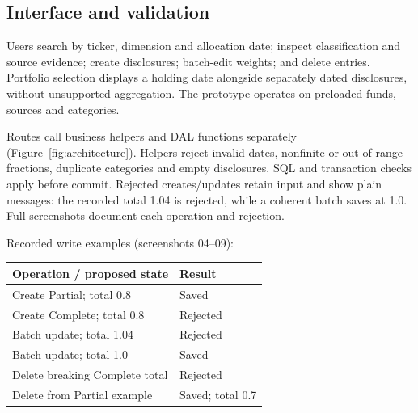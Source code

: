 \subsection{Interface and validation}
Users search by ticker, dimension and allocation date; inspect classification
and source evidence; create disclosures; batch-edit weights; and delete entries.
Portfolio selection displays a holding date alongside separately dated
disclosures, without unsupported aggregation. The prototype operates on
preloaded funds, sources and categories.

Routes call business helpers and DAL functions separately
(Figure~\ref{fig:architecture}). Helpers reject invalid dates, nonfinite or
out-of-range fractions, duplicate categories and empty disclosures. SQL and
transaction checks apply before commit. Rejected creates/updates retain input
and show plain messages: the recorded total 1.04 is rejected, while a coherent
batch saves at 1.0. Full screenshots document each operation and rejection.

\noindent\begin{minipage}{\columnwidth}
Recorded write examples (screenshots 04--09):
\begin{center}
\small
\begin{tabular}{@{}p{}p{}@{}}
\toprule
\textbf{Operation / proposed state} & \textbf{Result} \\
\midrule
Create Partial; total 0.8 & Saved \\
Create Complete; total 0.8 & Rejected \\
Batch update; total 1.04 & Rejected \\
Batch update; total 1.0 & Saved \\
Delete breaking Complete total & Rejected \\
Delete from Partial example & Saved; total 0.7 \\
\bottomrule
\end{tabular}
\end{center}
\end{minipage}
